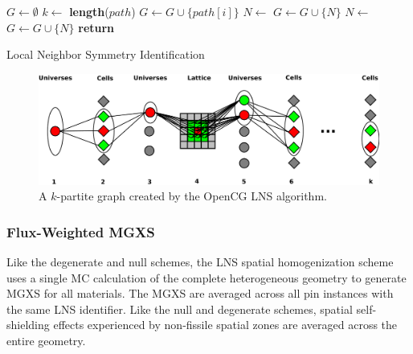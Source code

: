 \begin{algorithm*}[h!]
\begin{algorithmic}[1]
    \State $G \gets \emptyset$ 
    \State $k \gets$ \textbf{length}($path$) 
            \State $G \gets G \cup \{path[i]\}$ 
            \State $N \gets$  
            \State $G \gets G \cup \{N\}$ 
            \State $N \gets$  
            \State $G \gets G \cup \{N\}$ 
        \EndIf
    \EndFor
    \State \textbf{return}  
\EndProcedure
\caption{Local Neighbor Symmetry Identification}
\label{alg:lns}
\end{algorithmic}
\end{algorithm*}

\begin{figure}[h!]
  \centering
  \includegraphics[width=0.8\linewidth]{figures/lns-k-partite-graph}
  \caption{A $k$-partite graph created by the OpenCG LNS algorithm.}
  \label{fig:lns-k-partite-graph}
\end{figure}

\subsubsection{Flux-Weighted MGXS}
\label{subsubsec:lns-math}

Like the degenerate and null schemes, the LNS spatial homogenization scheme uses a single MC calculation of the complete heterogeneous geometry to generate MGXS for all materials. The MGXS are averaged across all pin instances with the same LNS identifier. Like the null and degenerate schemes, spatial self-shielding effects experienced by non-fissile spatial zones are averaged across the entire geometry. 

